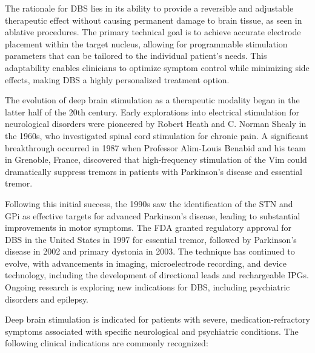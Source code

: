 The rationale for DBS lies in its ability to provide a reversible and adjustable therapeutic effect without causing permanent damage to brain tissue, as seen in ablative procedures. The primary technical goal is to achieve accurate electrode placement within the target nucleus, allowing for programmable stimulation parameters that can be tailored to the individual patient's needs. This adaptability enables clinicians to optimize symptom control while minimizing side effects, making DBS a highly personalized treatment option.

The evolution of deep brain stimulation as a therapeutic modality began in the latter half of the 20th century. Early explorations into electrical stimulation for neurological disorders were pioneered by Robert Heath and C. Norman Shealy in the 1960s, who investigated spinal cord stimulation for chronic pain. A significant breakthrough occurred in 1987 when Professor Alim-Louis Benabid and his team in Grenoble, France, discovered that high-frequency stimulation of the Vim could dramatically suppress tremors in patients with Parkinson's disease and essential tremor.

Following this initial success, the 1990s saw the identification of the STN and GPi as effective targets for advanced Parkinson's disease, leading to substantial improvements in motor symptoms. The FDA granted regulatory approval for DBS in the United States in 1997 for essential tremor, followed by Parkinson's disease in 2002 and primary dystonia in 2003. The technique has continued to evolve, with advancements in imaging, microelectrode recording, and device technology, including the development of directional leads and rechargeable IPGs. Ongoing research is exploring new indications for DBS, including psychiatric disorders and epilepsy.

Deep brain stimulation is indicated for patients with severe, medication-refractory symptoms associated with specific neurological and psychiatric conditions. The following clinical indications are commonly recognized:

